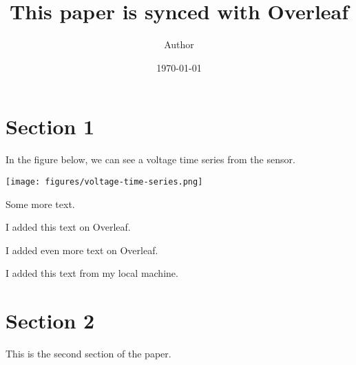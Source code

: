 \documentclass[11pt]{article}
\title{This paper is synced with Overleaf}
\author{ Author }
\date{\today}
\begin{document}
\maketitle
\pagebreak



\section{Section 1}

In the figure below,
we can see a voltage time series from the sensor.

\texttt{[image: figures/voltage-time-series.png]}

Some more text.

I added this text on Overleaf.

I added even more text on Overleaf.

I added this text from my local machine.

\pagebreak
\section{Section 2}

This is the second section of the paper.

\end{document}
